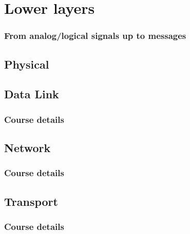 \section{Lower layers}
  \begin{frame}
    \frametitle{From analog/logical signals up to messages}
  \end{frame}
\subsection{Physical}
  \begin{frame}
    \frametitle{}
  \end{frame}
\subsection{Data Link}
  \begin{frame}
    \frametitle{Course details}
  \end{frame}
\subsection{Network}
  \begin{frame}
    \frametitle{Course details}
  \end{frame}
\subsection{Transport}
  \begin{frame}
    \frametitle{Course details}
  \end{frame}